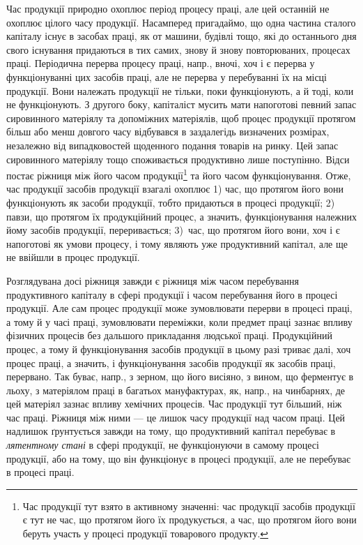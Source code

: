 Час продукції природно охоплює період процесу праці, але цей
останній не охоплює цілого часу продукції. Насамперед пригадаймо, що
одна частина сталого капіталу існує в засобах праці, як от машини,
будівлі тощо, які до останнього дня свого існування придаються в тих
самих, знову й знову повторюваних, процесах праці. Періодична перерва
процесу праці, напр., вночі, хоч і є перерва у функціонуванні цих засобів
праці, але не перерва у перебуванні їх на місці продукції. Вони
належать продукції не тільки, поки функціонують, а й тоді, коли не функціонують.
З другого боку, капіталіст мусить мати напоготові певний запас
сировинного матеріялу та допоміжних матеріялів, щоб процес продукції
протягом більш або менш довгого часу відбувався в заздалегідь визначених
розмірах, незалежно від випадковостей щоденного подання товарів
на ринку. Цей запас сировинного матеріялу тощо споживається продуктивно
лише поступінно. Відси постає ріжниця між його часом продукції\footnote{
Час продукції тут взято в активному значенні: час продукції засобів продукції
є тут не час, що протягом його їх продукується, а час, що протягом його
вони беруть участь у процесі продукції товарового продукту.
}
та його часом функціонування. Отже, час продукції засобів
продукції взагалі охоплює 1) час, що протягом його вони функціонують
як засоби продукції, тобто придаються в процесі продукції;
2) павзи, що протягом їх продукційний процес, а значить, функціонування
належних йому засобів продукції, переривається; 3)~час, що
протягом його вони, хоч і є напоготові як умови процесу, і тому являють
уже продуктивний капітал, але ще не ввійшли в процес продукції.

Розглядувана досі ріжниця завжди є ріжниця між часом перебування
продуктивного капіталу в сфері продукції і часом перебування його в
процесі продукції. Але сам процес продукції може зумовлювати перерви
в процесі праці, а тому й у часі праці, зумовлювати переміжки, коли
предмет праці зазнає впливу фізичних процесів без дальшого прикладання
людської праці. Продукційний процес, а тому й функціонування засобів
продукції в цьому разі триває далі, хоч процес праці, а значить, і функціонування
засобів продукції як засобів праці, перервано. Так буває, напр.,
з зерном, що його висіяно, з вином, що ферментує в льоху, з матеріялом
праці в багатьох мануфактурах, як, напр., на чинбарнях, де цей матеріял
зазнає впливу хемічних процесів. Час продукції тут більший, ніж час
праці. Ріжниця між ними — це лишок часу продукції над часом праці.
Цей надлишок ґрунтується завжди на тому, що продуктивний капітал
перебуває в \emph{лятентному стані} в сфері продукції, не функціонуючи в
самому процесі продукції, або на тому, що він функціонує в процесі
продукції, але не перебуває в процесі праці.

